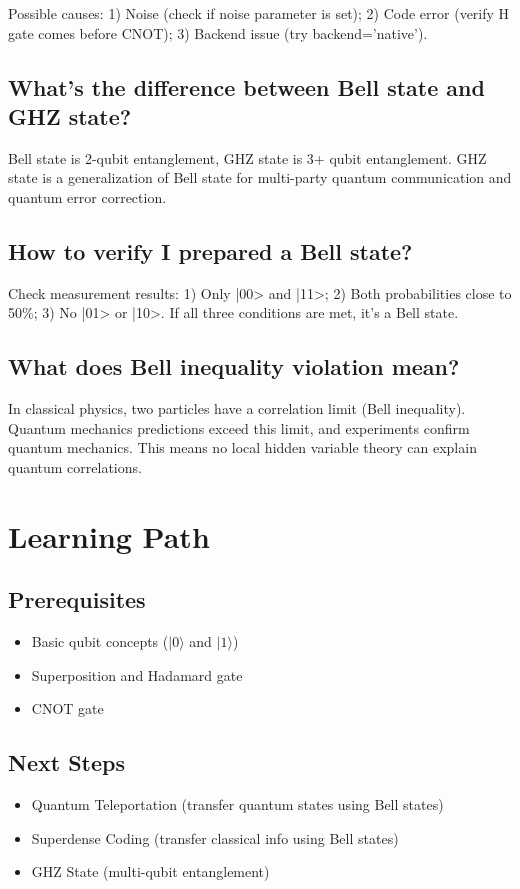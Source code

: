 \documentclass[12pt,a4paper]{article}
\begin{document}
Possible causes: 1) Noise (check if noise parameter is set); 2) Code error (verify H gate comes before CNOT); 3) Backend issue (try backend='native').

\subsection{What's the difference between Bell state and GHZ state?}

Bell state is 2-qubit entanglement, GHZ state is 3+ qubit entanglement. GHZ state is a generalization of Bell state for multi-party quantum communication and quantum error correction.

\subsection{How to verify I prepared a Bell state?}

Check measurement results: 1) Only |00> and |11>; 2) Both probabilities close to 50\%; 3) No |01> or |10>. If all three conditions are met, it's a Bell state.

\subsection{What does Bell inequality violation mean?}

In classical physics, two particles have a correlation limit (Bell inequality). Quantum mechanics predictions exceed this limit, and experiments confirm quantum mechanics. This means no local hidden variable theory can explain quantum correlations.

\section{Learning Path}

\subsection{Prerequisites}
\begin{itemize}
  \item Basic qubit concepts ($|0\rangle$ and $|1\rangle$)
  \item Superposition and Hadamard gate
  \item CNOT gate
\end{itemize}

\subsection{Next Steps}
\begin{itemize}
  \item Quantum Teleportation (transfer quantum states using Bell states)
  \item Superdense Coding (transfer classical info using Bell states)
  \item GHZ State (multi-qubit entanglement)
\end{itemize}
\end{document}
